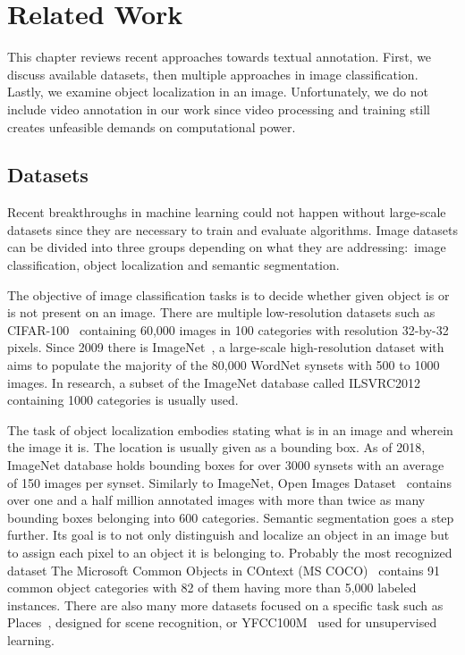 \chapter{Related Work}\label{chap:related_work}
This chapter reviews recent approaches towards textual annotation. First, we discuss available datasets, then multiple approaches in image classification. Lastly, we examine object localization in an image. Unfortunately, we do not include video annotation in our work since video processing and training still creates unfeasible demands on computational power.

\section{Datasets}
Recent breakthroughs in machine learning could not happen without large-scale datasets since they are necessary to train and evaluate algorithms. Image datasets can be divided into three groups depending on what they are addressing:~image classification, object localization and semantic segmentation.

The objective of image classification tasks is to decide whether given object is or is not present on an image. There are multiple low-resolution datasets such as CIFAR-100~\cite{krizhevsky2009learning} containing 60,000 images in 100 categories with resolution 32-by-32 pixels. Since 2009 there is ImageNet~\cite{ILSVRC15}, a large-scale high-resolution dataset with aims to populate the majority of the 80,000 WordNet synsets with 500 to 1000 images. In research, a subset of the ImageNet database called ILSVRC2012 containing 1000 categories is usually used.

The task of object localization embodies stating what is in an image and wherein the image it is. The location is usually given as a bounding box. As of 2018, ImageNet database holds bounding boxes for over 3000 synsets with an average of 150 images per synset. Similarly to ImageNet, Open Images Dataset~\cite{openimages} contains over one and a half million annotated images with more than twice as many bounding boxes belonging into 600 categories. Semantic segmentation goes a step further. Its goal is to not only distinguish and localize an object in an image but to assign each pixel to an object it is belonging to. Probably the most recognized dataset The Microsoft Common Objects in COntext (MS COCO)~\cite{lin2014microsoft} contains 91 common object categories with 82 of them having more than 5,000 labeled instances. There are also many more datasets focused on a specific task such as Places~\cite{zhou2017places}, designed for scene recognition, or YFCC100M~\cite{YFCC100M} used for unsupervised learning.

